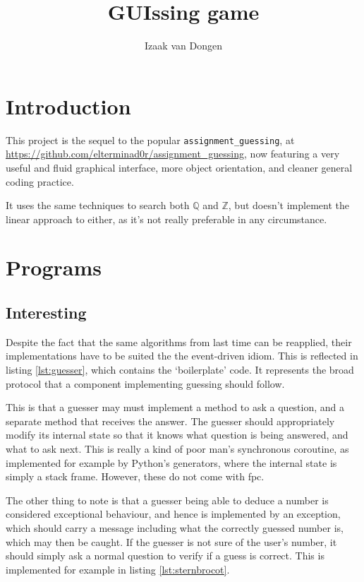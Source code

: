 \documentclass[a4paper,11pt]{article}
\title{GUIssing game}
\author{Izaak van Dongen}
\begin{document}
    \maketitle\thispagestyle{empty} %
    \tableofcontents
    \listoflistings

    \section{Introduction}

    This project is the sequel to the popular \texttt{assignment\_guessing},
    at \url{https://github.com/elterminad0r/assignment_guessing}, now featuring
    a very useful and fluid graphical interface, more object orientation, and
    cleaner general coding practice.

    It uses the same techniques to search both $\mathbb{Q}$ and $\mathbb{Z}$,
    but doesn't implement the linear approach to either, as it's not really
    preferable in any circumstance.

    \section{Programs}

    \subsection{Interesting}

    Despite the fact that the same algorithms from last time can be reapplied,
    their implementations have to be suited the the event-driven idiom. This is
    reflected in listing \ref{lst:guesser}, which contains the `boilerplate'
    code. It represents the broad protocol that a component implementing
    guessing should follow.

    This is that a guesser may must implement a method to ask a question, and a
    separate method that receives the answer. The guesser should appropriately
    modify its internal state so that it knows what question is being answered,
    and what to ask next. This is really a kind of poor man's synchronous
    coroutine, as implemented for example by Python's generators, where the
    internal state is simply a stack frame. However, these do not come with fpc.

    The other thing to note is that a guesser being able to deduce a number is
    considered exceptional behaviour, and hence is implemented by an exception,
    which should carry a message including what the correctly guessed number is,
    which may then be caught. If the guesser is not sure of the user's number,
    it should simply ask a normal question to verify if a guess is correct. This
    is implemented for example in listing \ref{lst:sternbrocot}.
\end{document}
